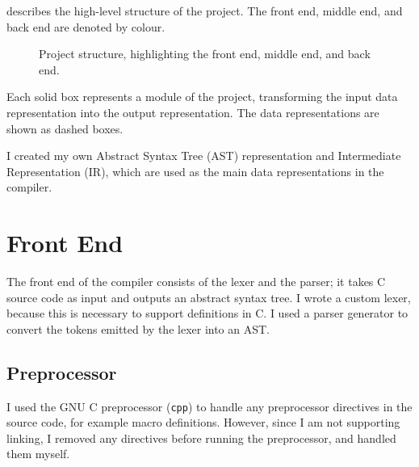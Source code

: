\documentclass[00-main.tex]{subfiles}
\begin{document}
 describes the high-level structure of the project. The \textcolor{frontendcolor}{front end}, \textcolor{middleendcolor}{middle end}, and \textcolor{backendcolor}{back end} are denoted by colour.

\begin{figure}[H]
  \centering
  \caption{Project structure, highlighting the \textcolor{frontendcolor}{front end}, \textcolor{middleendcolor}{middle end}, and \textcolor{backendcolor}{back end}.}
  \label{fig:project flowchart}
\end{figure}

Each solid box represents a module of the project, transforming the input data representation into the output representation.
The data representations are shown as dashed boxes.

I created my own Abstract Syntax Tree (AST) representation and Intermediate Representation (IR), which are used as the main data representations in the compiler.


\section{Front End}


The front end of the compiler consists of the lexer and the parser; it takes C source code as input and outputs an abstract syntax tree.
I wrote a custom lexer, because this is necessary to support  definitions in C\@.
I used a parser generator to convert the tokens emitted by the lexer into an AST\@.

\subsection{Preprocessor}

I used the GNU C preprocessor (\texttt{cpp})  to handle any preprocessor directives in the source code, for example macro definitions.
However, since I am not supporting linking, I removed any  directives before running the preprocessor, and handled them myself.
\end{document}
